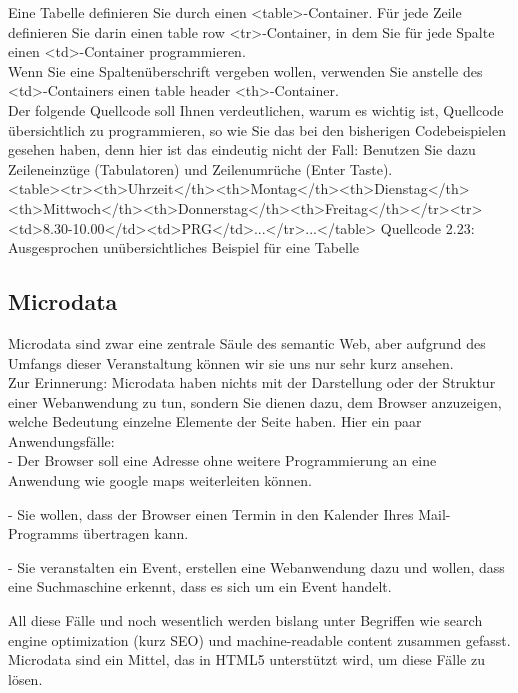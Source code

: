 Eine Tabelle definieren Sie durch einen <table>-Container. Für jede Zeile definieren Sie darin einen table row <tr>-Container, in dem Sie für jede Spalte einen <td>-Container programmieren.\\

Wenn Sie eine Spaltenüberschrift vergeben wollen, verwenden Sie anstelle des <td>-Containers einen table header <th>-Container.\\

Der folgende Quellcode soll Ihnen verdeutlichen, warum es wichtig ist, Quellcode übersichtlich zu programmieren, so wie Sie das bei den bisherigen Codebeispielen gesehen haben, denn hier ist das eindeutig nicht der Fall: Benutzen Sie dazu Zeileneinzüge (Tabulatoren) und Zeilenumrüche (Enter Taste).\\

<table><tr><th>Uhrzeit</th><th>Montag</th><th>Dienstag</th><th>Mittwoch</th><th>Donnerstag</th><th>Freitag</th></tr><tr><td>8.30-10.00</td><td>PRG</td>...</tr>...</table>
Quellcode 2.23: Ausgesprochen unübersichtliches Beispiel für eine Tabelle

\subsection{Microdata}

Microdata sind zwar eine zentrale Säule des semantic Web, aber aufgrund des Umfangs dieser Veranstaltung können wir sie uns nur sehr kurz ansehen.\\

Zur Erinnerung: Microdata haben nichts mit der Darstellung oder der Struktur einer Webanwendung zu tun, sondern Sie dienen dazu, dem Browser anzuzeigen, welche Bedeutung einzelne Elemente der Seite haben. Hier ein paar Anwendungsfälle:\\

-	Der Browser soll eine Adresse ohne weitere Programmierung an eine Anwendung wie google maps weiterleiten können.

-	Sie wollen, dass der Browser einen Termin in den Kalender Ihres Mail-Programms übertragen kann.

-	Sie veranstalten ein Event, erstellen eine Webanwendung dazu und wollen, dass eine Suchmaschine erkennt, dass es sich um ein Event handelt.

All diese Fälle und noch wesentlich werden bislang unter Begriffen wie search engine optimization (kurz SEO) und machine-readable content zusammen gefasst. Microdata sind ein Mittel, das in HTML5 unterstützt wird, um diese Fälle zu lösen.

